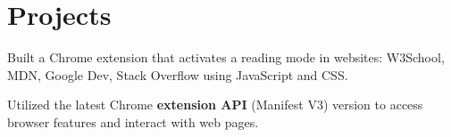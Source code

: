 
\section{Projects}


\begin{tightemize}
  \item Built a Chrome extension that activates a reading mode in websites: W3School, MDN, Google Dev, Stack Overflow using JavaScript and CSS.
  \item Utilized the latest Chrome {\bf extension API} (Manifest V3) version to access browser features and interact with web pages.
\end{tightemize}
\sectionsep


